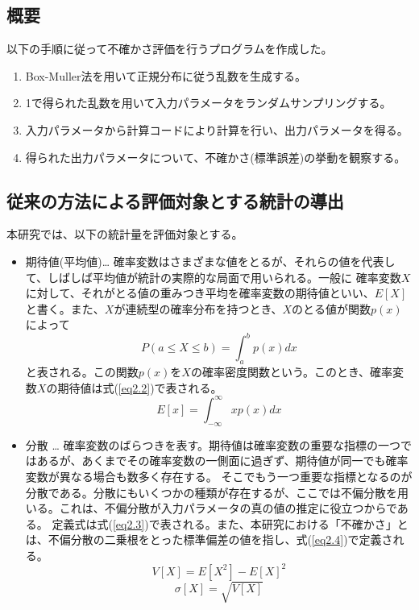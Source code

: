 \documentclass[a4paper,11pt,titlepage,uplatex]{jsreport}
\begin{document}
\subsection{概要}
以下の手順に従って不確かさ評価を行うプログラムを作成した。

\begin{enumerate}
  \item Box-Muller法を用いて正規分布に従う乱数を生成する。
  \item 1で得られた乱数を用いて入力パラメータをランダムサンプリングする。
  \item 入力パラメータから計算コードにより計算を行い、出力パラメータを得る。
  \item 得られた出力パラメータについて、不確かさ(標準誤差)の挙動を観察する。
\end{enumerate}

\subsection{従来の方法による評価対象とする統計の導出}
本研究では、以下の統計量を評価対象とする。

\begin{itemize}
  \item 期待値(平均値)… 確率変数はさまざまな値をとるが、それらの値を代表して、しばしば平均値が統計の実際的な局面で用いられる。一般に
  確率変数$X$に対して、それがとる値の重みつき平均を確率変数の期待値といい、$E\left[X\right]$と書く。また、$X$が連続型の確率分布を持つとき、$X$のとる値が関数$p\left(x\right)$によって
  \begin{equation}
    P\left( a \leq X \leq b \right) = \int_a^b p\left(x\right) dx 
    \label{eq2.1}
  \end{equation}
  と表される。この関数$p \left( x \right)$を$X$の確率密度関数という。このとき、確率変数$X$の期待値は式(\ref{eq2.2})で表される。
  \begin{equation}
    E\left[x\right] = \int_{-\infty}^{\infty} xp\left(x\right) dx 
    \label{eq2.2}
  \end{equation}

  \vspace{1.0\baselineskip}

  \item 分散 … 確率変数のばらつきを表す。期待値は確率変数の重要な指標の一つではあるが、あくまでその確率変数の一側面に過ぎず、期待値が同一でも確率変数が異なる場合も数多く存在する。
  そこでもう一つ重要な指標となるのが分散である。分散にもいくつかの種類が存在するが、ここでは不偏分散を用いる。これは、不偏分散が入力パラメータの真の値の推定に役立つからである。
  定義式は式(\ref{eq2.3})で表される。また、本研究における「不確かさ」とは、不偏分散の二乗根をとった標準偏差の値を指し、式(\ref{eq2.4})で定義される。
  \begin{equation}
    V\left[X\right] = E\left[ X^2 \right] - E\left[ X \right]^2
    \label{eq2.3}
  \end{equation}
  \begin{equation}
    \sigma \left[X\right] = \sqrt{V\left[ X\right]}
    \label{eq2.4}
  \end{equation}
\end{itemize}
\end{document}

